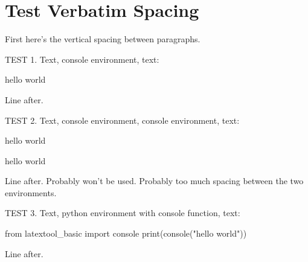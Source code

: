 \section{Test Verbatim Spacing}

First here's the vertical spacing between paragraphs.
\lipsum[2]

\lipsum[2]

TEST 1. Text, console environment, text:
\begin{console}
hello world
\end{console}
Line after.


TEST 2. Text, console environment, console environment, text:
\begin{console}
hello world
\end{console}
\begin{console}
hello world
\end{console}
Line after. 
Probably won't be used.
Probably too much spacing between the two environments.


TEST 3. Text, python environment with console function, text:
\begin{python}
from latextool_basic import console
print(console("hello world"))
\end{python}
Line after. 





